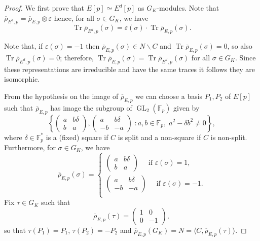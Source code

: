 \documentclass[12pt]{amsart}
\newcommand{\F}{\mathbb{F}}
\newcommand{\rhobar}{{\overline{\rho}}}
\newcommand{\eps}{\varepsilon}
\DeclareMathOperator{\Tr}{Tr}
\newcommand{\GL}{\operatorname{GL}}
\numberwithin{equation}{section}
\theoremstyle{definition}
\theoremstyle{remark}
\begin{document}
\begin{proof} We first prove that $E[p] \simeq E^d[p]$ as $G_K$-modules. 
Note that $\rhobar_{{E^d}, p} = \rhobar_{E, p} \otimes \eps$ hence,
for all $\sigma \in G_K$, we have 
\[\Tr \rhobar_{{E^d},p}(\sigma) = \eps(\sigma) \cdot \Tr \rhobar_{E,p}(\sigma).\]

Note that, if $\eps(\sigma) = -1$ then $\rhobar_{E,p}(\sigma) \in N\backslash C$ and $\Tr \rhobar_{E,p}(\sigma) = 0$, so also $\Tr \rhobar_{E^d,p}(\sigma) = 0$;
therefore, $\Tr \rhobar_{E,p}(\sigma) = \Tr \rhobar_{E^d,p}(\sigma)$ 
for all $\sigma \in G_K$. Since these representations are irreducible and have
the same traces it follows they are isomorphic.

From the hypothesis on the image of $\rhobar_{E,p}$ we can 
choose a basis $P_1, P_2$ of $E[p]$ such that $\rhobar_{E,p}$ has image 
the subgroup of $\GL_2(\F_p)$ given by 
\[
\left\{ 
\begin{pmatrix}
a & b\delta \\
b & a
\end{pmatrix}, 
\begin{pmatrix}
a & b\delta \\
-b & -a
\end{pmatrix}  \; : a, b \in \F_p, \; a^2 - \delta b^2 \neq 0 \right\},
\]
where $\delta \in \F_p^*$ is a (fixed) square if $C$ is split and 
a non-square if $C$ is non-split. Furthermore, for $\sigma \in G_K$, we have 
\[
 \rhobar_{E,p}(\sigma) = \begin{cases} 
                            \begin{pmatrix}
                            a & b\delta \\
                            b & a
                            \end{pmatrix} \quad \text{ if } \eps(\sigma) = 1,  \\
\begin{pmatrix}
a & b\delta \\
-b & -a
\end{pmatrix} \quad \text{ if } \eps(\sigma) = -1.  \\
\end{cases}\]
Fix $\tau \in G_K$ such that 
\[
 \rhobar_{E,p}(\tau) =  \begin{pmatrix}
                            1 & 0 \\
                            0 & -1
                            \end{pmatrix},
\]
so that  $\tau(P_1) = P_1$, $\tau(P_2) = -P_2$ and 
$\rhobar_{E,p}(G_K) = N = \langle C,\rhobar_{E,p}(\tau) \rangle$.



\end{proof}
\end{document}
